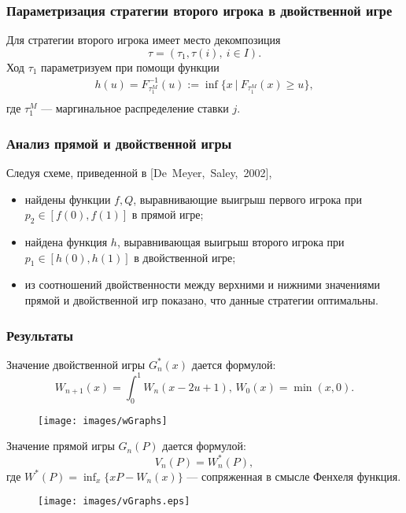 \documentclass[12pt]{beamer}
\begin{document}
\begin{frame}
  \frametitle{Параметризация стратегии второго игрока в двойственной игре}
  
  Для стратегии второго игрока имеет место декомпозиция 
  \[
    \tau = (\tau_1, \tau(i),\ i \in I).
  \]
  Ход $\tau_1$ параметризуем при помощи функции
  \begin{gather*}
    h(u) = F^{-1}_{\tau^M_1}(u) := \inf \{ x\ |\ F_{\tau^M_1}(x) \geqslant u \},\\
  \end{gather*}
  где $\tau^M_1$ --- маргинальное распределение ставки $j$.
\end{frame}

\begin{frame}
  \frametitle{Анализ прямой и двойственной игры}
  
  Следуя схеме, приведенной в [De~Meyer,~Saley,~2002],
  \begin{itemize}
  \item найдены функции $f, Q$, выравнивающие выигрыш первого игрока при $p_2 \in
    [f(0), f(1)]$ в прямой игре;
  \item найдена функция $h$, выравнивающая выигрыш второго игрока при $p_1 \in
    [h(0), h(1)]$ в двойственной игре;
  \item из соотношений двойственности между верхними и нижними значениями
    прямой и двойственной игр показано, что данные стратегии оптимальны.
  \end{itemize}
\end{frame}
  
    
\begin{frame}
  \frametitle{Результаты}
  
  Значение двойственной игры $G^*_n(x)$ дается формулой:
  \begin{equation*}
    W_{n+1}(x) = \int_0^1 W_n(x - 2u + 1), \, W_0(x) = \min(x, 0).
  \end{equation*}
  
  \begin{figure}[H!]
    \centering
    \texttt{[image: images/wGraphs]}
  \end{figure}
\end{frame} 

\begin{frame}
  Значение прямой игры $G_n(P)$ дается формулой:
  \begin{equation*}
    V_n(P) = W_n^*(P),
  \end{equation*}
  где $W^*(P) = \inf_x \{ x P - W_n(x) \}$ --- сопряженная в смысле Фенхеля функция.

  \begin{figure}[H!]
    \centering
    \texttt{[image: images/vGraphs.eps]}
  \end{figure}
\end{frame}
\end{document}
